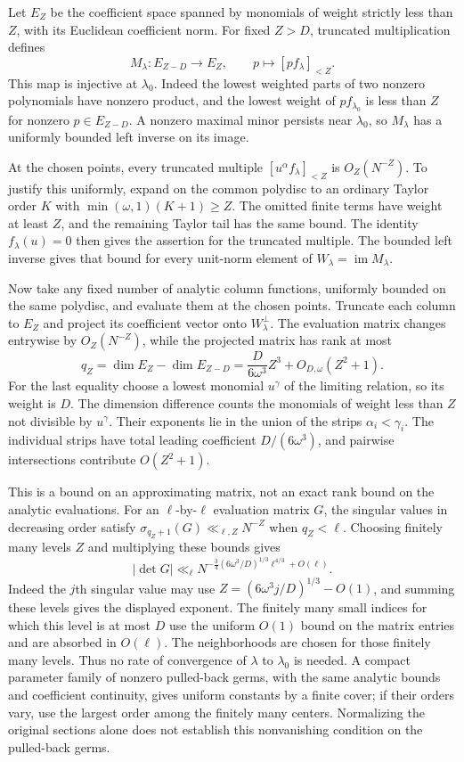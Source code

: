 Let $E_Z$ be the coefficient space spanned by monomials of weight
strictly less than $Z$, with its Euclidean coefficient norm. For fixed
$Z>D$, truncated multiplication defines
\[
 M_\lambda:E_{Z-D}\longrightarrow E_Z,\qquad
 p\longmapsto[p f_\lambda]_{<Z}.
\]
This map is injective at $\lambda_0$. Indeed the lowest weighted
parts of two nonzero polynomials have nonzero product, and the lowest
weight of $p f_{\lambda_0}$ is less than $Z$ for nonzero
$p\in E_{Z-D}$. A nonzero maximal minor persists near $\lambda_0$,
so $M_\lambda$ has a uniformly bounded left inverse on its image.

At the chosen points, every truncated multiple
$[u^\alpha f_\lambda]_{<Z}$ is $O_Z(N^{-Z})$. To justify this uniformly,
expand on the common polydisc to an ordinary Taylor order $K$ with
$\min(\omega,1)(K+1)\ge Z$. The omitted finite terms have weight at
least $Z$, and the remaining Taylor tail has the same bound. The
identity $f_\lambda(u)=0$ then gives the assertion for the truncated
multiple. The bounded left inverse gives that bound for every
unit-norm element of $W_\lambda=\operatorname{im}M_\lambda$.

Now take any fixed number of analytic column functions, uniformly
bounded on the same polydisc, and evaluate them at the chosen points.
Truncate each column to $E_Z$ and project its coefficient vector onto
$W_\lambda^\perp$. The evaluation matrix changes entrywise by
$O_Z(N^{-Z})$, while the projected matrix has rank at most
\[
 q_Z=\dim E_Z-\dim E_{Z-D}
     =\frac{D}{6\omega^3}Z^3+O_{D,\omega}(Z^2+1).
\]
For the last equality choose a lowest monomial $u^\gamma$ of the
limiting relation, so its weight is $D$. The dimension difference
counts the monomials of weight less than $Z$ not divisible by
$u^\gamma$. Their exponents lie in the union of the strips
$\alpha_i<\gamma_i$. The individual strips have total leading
coefficient $D/(6\omega^3)$, and pairwise intersections contribute
$O(Z^2+1)$.

This is a bound on an approximating matrix, not an exact rank bound
on the analytic evaluations. For an $\ell$-by-$\ell$ evaluation matrix
$G$, the singular values in decreasing order satisfy
$\sigma_{q_Z+1}(G)\ll_{\ell,Z}N^{-Z}$ when $q_Z<\ell$.
Choosing finitely many levels $Z$ and multiplying these bounds gives
\[
 |\det G|\ll_\ell
 N^{-\frac34(6\omega^3/D)^{1/3}\ell^{4/3}+O(\ell)}.
\]
Indeed the $j$th singular value may use
$Z=(6\omega^3j/D)^{1/3}-O(1)$, and summing these levels gives the
displayed exponent. The finitely many small indices for which this
level is at most $D$ use the uniform $O(1)$ bound on the matrix entries
and are absorbed in $O(\ell)$. The neighborhoods are chosen for those finitely
many levels. Thus no rate of convergence of $\lambda$ to $\lambda_0$
is needed. A compact parameter family of nonzero pulled-back germs,
with the same analytic bounds and coefficient continuity, gives uniform
constants by a finite cover; if their orders vary, use the largest
order among the finitely many centers. Normalizing the original
sections alone does not establish this nonvanishing condition on
the pulled-back germs.

